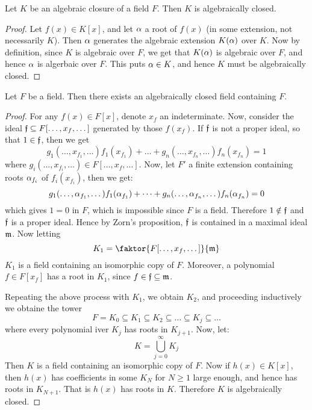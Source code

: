 \begin{proposition}\label{propostion_8.5.3}
  Let $K$ be an algebraic closure of a field $F$. Then $K$ is
  algebraically closed.
\end{proposition}
\begin{proof}
  Let $f(x) \in K[x]$, and let $\alpha$ a root of $f(x)$ (in some
  extension, not necessarily $K$). Then $\alpha$ generates the algebraic
  extension $K(\alpha)$ over $K$. Now by definition, since $K$ is
  algebraic over $F$,  we get that $K(\alpha)$ is algebraic over $F$, and
  hence $\alpha$ is algerbaic over $F$. This puts $\alpha \in K$, and hence
  $K$ must be algebraically closed.
\end{proof}

\begin{proposition}\label{proposition_8.5.4}
  Let $F$ be a field. Then there exists an algebraically closed field
  containing $F$.
\end{proposition}
\begin{proof}
  For any $f(x) \in F[x]$, denote $x_f$ an indeterminate. Now,
  consider the ideal $\mathfrak{f} \subseteq F[\dots, x_f,\dots]$ generated by
  those $f(x_f)$. If $\mathfrak{f}$ is not a proper ideal, so that $1 \in \mathfrak{f}$,
  then we get
  \begin{equation*}
    g_1(\dots, x_{f_1}, \dots)f_1(x_{f_1})+
    \dots+g_n(\dots, x_{f_n},\dots)f_n(x_{f_n})=1
  \end{equation*}
  where $g_i(\dots, x_{f_i}, \dots) \in F[\dots, x_f, \dots]$. Now,
  let $F'$ a finite extension containing roots $\alpha_{f_i}$ of
  $f_i(x_{f_i})$, then we get:
  \begin{equation*}
    g_1(\dots, \alpha_{f_1}, \dots)f_1(\alpha_{f_1})+\dots+
    g_n(\dots, \alpha_{f_n}, \dots)f_n(\alpha_{f_n})=0
  \end{equation*}
  which gives $1=0$ in $F$, which is impossible since $F$ is a field.
  Therefore $1 \notin \mathfrak{f}$ and  $\mathfrak{f}$ is a proper ideal. Hence by
  Zorn's proposition, $\mathfrak{f}$ is contained in a maximal ideal $\mathfrak{m}$. Now
  letting
  \begin{equation*}
    K_1=\faktor{F[\dots, x_f, \dots]}{\mf}
  \end{equation*}
  $K_1$ is a field containing an isomorphic copy of $F$. Moreover, a
  polynomial $f \in F[x_f]$ has a root in $K_1$, since $f \in \mathfrak{f}
  \subseteq \mathfrak{m}$.

  Repeating the above process with $K_1$, we obtain $K_2$, and
  proceeding inductively we obtaine the tower
  \begin{equation*}
    F=K_0 \subseteq K_1 \subseteq K_2 \subseteq \dots
    \subseteq K_j \subseteq \dots
  \end{equation*}
  where every polynomial iver $K_j$ has roots in $K_{j+1}$. Now, let:
  \begin{equation*}
    K=\bigcup_{j=0}^\infty{K_j}
  \end{equation*}
  Then $K$ is a field containing an isomorphic copy of $F$. Now if
  $h(x) \in K[x]$, then $h(x)$ has coefficients in some $K_N$ for $N
  \geq 1$ large enough, and hence has roots in $K_{N+1}$. That is
  $h(x)$ has roots in $K$. Therefore $K$ is algebraically closed.
\end{proof}


